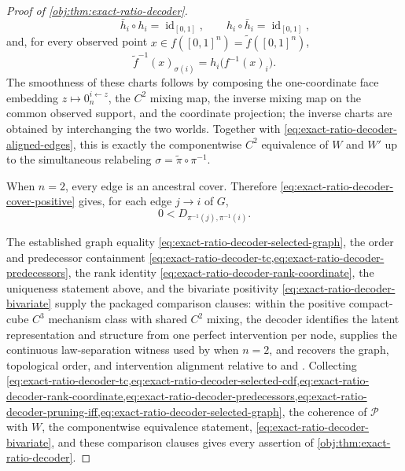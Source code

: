 \documentclass[11pt]{article}
\begin{document}
\begin{proof}[Proof of \cref{obj:thm:exact-ratio-decoder}]
\[\qquad
\bar h_i\circ h_i=\operatorname{id}_{[0,1]},
\qquad
h_i\circ\bar h_i=\operatorname{id}_{[0,1]},
\]
and, for every observed point \(x\in f([0,1]^n)=\widetilde f([0,1]^n)\),
\begin{equation}
\widetilde f^{-1}(x)_{\sigma(i)}=h_i\bigl(f^{-1}(x)_i\bigr).
\label{eq:exact-ratio-decoder-componentwise-assembly-target}
\end{equation}
The smoothness of these charts follows by composing the one-coordinate face embedding \(z\mapsto 0_n^{i\leftarrow z}\), the \(C^2\) mixing map, the inverse mixing map on the common observed support, and the coordinate projection; the inverse charts are obtained by interchanging the two worlds. Together with \cref{eq:exact-ratio-decoder-aligned-edges}, this is exactly the componentwise \(C^2\) equivalence of \(W\) and \(W'\) up to the simultaneous relabeling \(\sigma=\widetilde\pi\circ\pi^{-1}\). %

When \(n=2\), every edge is an ancestral cover. Therefore \cref{eq:exact-ratio-decoder-cover-positive} gives, for each edge \(j\to i\) of \(G\),
\begin{equation}
0<D_{\pi^{-1}(j),\pi^{-1}(i)}.
\label{eq:exact-ratio-decoder-bivariate}
\end{equation}

The established graph equality \cref{eq:exact-ratio-decoder-selected-graph}, the order and predecessor containment \cref{eq:exact-ratio-decoder-tc,eq:exact-ratio-decoder-predecessors}, the rank identity \cref{eq:exact-ratio-decoder-rank-coordinate}, the uniqueness statement above, and the bivariate positivity \cref{eq:exact-ratio-decoder-bivariate} supply the packaged comparison clauses: within the positive compact-cube \(C^3\) mechanism class with shared \(C^2\) mixing, the decoder identifies the latent representation and structure from one perfect intervention per node, supplies the continuous law-separation witness used by \citet[Theorem~3.2]{vonKugelgenEtAl2023UnknownInterventions} when \(n=2\), and recovers the graph, topological order, and intervention alignment relative to \citet[Theorem~4.2]{WendongEtAl2023CauCA} and \citet[Corollary~{D}.1]{YaoEtAl2025InvariancePrinciple}. Collecting \cref{eq:exact-ratio-decoder-tc,eq:exact-ratio-decoder-selected-cdf,eq:exact-ratio-decoder-rank-coordinate,eq:exact-ratio-decoder-predecessors,eq:exact-ratio-decoder-pruning-iff,eq:exact-ratio-decoder-selected-graph}, the coherence of \(\mathcal P\) with \(W\), the componentwise equivalence statement, \cref{eq:exact-ratio-decoder-bivariate}, and these comparison clauses gives every assertion of \cref{obj:thm:exact-ratio-decoder}. %
\end{proof}
\end{document}
